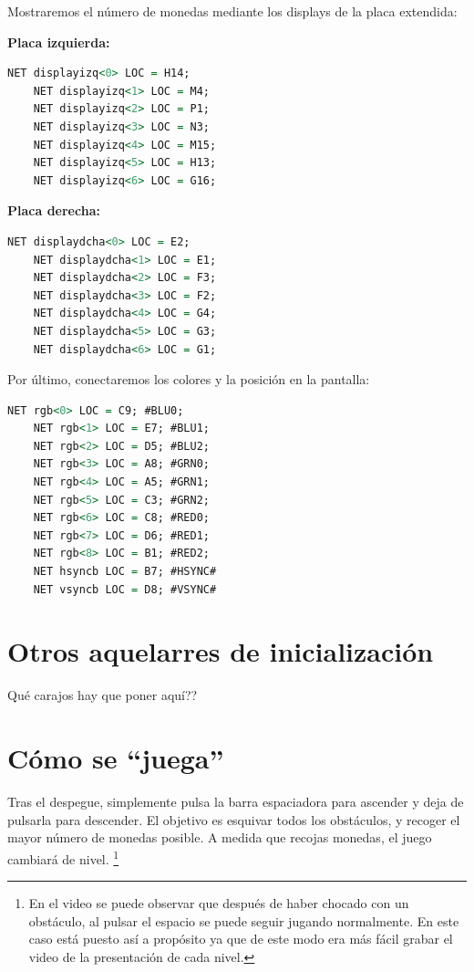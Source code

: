 \documentclass[11pt, a4paper, spanish, openright, twoside]{book}
\begin{document}
Mostraremos el número de monedas mediante los displays de la placa extendida:

\textbf{Placa izquierda:}

\begin{lstlisting}[language=VHDL]
	NET displayizq<0> LOC = H14;
	NET displayizq<1> LOC = M4;
	NET displayizq<2> LOC = P1;
	NET displayizq<3> LOC = N3;
	NET displayizq<4> LOC = M15;
	NET displayizq<5> LOC = H13;
	NET displayizq<6> LOC = G16;
\end{lstlisting}

\textbf{Placa derecha:}
	
\begin{lstlisting}[language=VHDL]
	NET displaydcha<0> LOC = E2;
	NET displaydcha<1> LOC = E1;
	NET displaydcha<2> LOC = F3;
	NET displaydcha<3> LOC = F2;
	NET displaydcha<4> LOC = G4;
	NET displaydcha<5> LOC = G3;
	NET displaydcha<6> LOC = G1;
\end{lstlisting}


Por último, conectaremos los colores y la posición en la pantalla:

\begin{lstlisting}[language=VHDL]
	NET rgb<0> LOC = C9; #BLU0;
	NET rgb<1> LOC = E7; #BLU1;
	NET rgb<2> LOC = D5; #BLU2;
	NET rgb<3> LOC = A8; #GRN0; 
	NET rgb<4> LOC = A5; #GRN1;
	NET rgb<5> LOC = C3; #GRN2;
	NET rgb<6> LOC = C8; #RED0;
	NET rgb<7> LOC = D6; #RED1;
	NET rgb<8> LOC = B1; #RED2;
	NET hsyncb LOC = B7; #HSYNC# 
	NET vsyncb LOC = D8; #VSYNC# 
\end{lstlisting}

\section{Otros aquelarres de inicialización}
Qué carajos hay que poner aquí??


\section{Cómo se ``juega''}
Tras el despegue, simplemente pulsa la barra espaciadora para ascender y deja de pulsarla para descender. El objetivo es esquivar todos los obstáculos, y recoger el mayor número de monedas posible. A medida que recojas monedas, el juego cambiará de nivel. \footnote{En el video se puede observar que después de haber chocado con un obstáculo, al pulsar el espacio se puede seguir jugando normalmente. En este caso está puesto así a propósito ya que de este modo era más fácil grabar el video de la presentación de cada nivel.}
\end{document}
